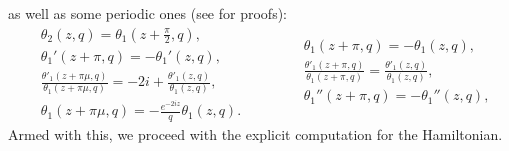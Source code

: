 \documentclass[11pt,twoside]{article}
\theoremstyle{definition}
\numberwithin{equation}{section}
\begin{document}
     as well as some periodic ones (see \cite{du1973elliptic} for proofs):
     \begin{equation}
     \label{eq: more properties of thetas}
\begin{split}
 &\theta_2(z,q) = \theta_1(z + \frac{\pi}{2},q), \\  &
         \theta_1'(z + \pi,q) = -\theta_1'(z,q),\\ 
& \frac{\theta'_1(z + \pi\mu,q)}{\theta_1(z + \pi\mu,q)} = -2i +\frac{\theta'_1(z,q)}{\theta_1(z,q)},\\ &\theta_1(z + \pi\mu,q)= -\frac{e^{-2 i z}}{q}\theta_1(z,q).
\end{split}
\ \ \ \ \ \ \ \ \ \ \ \ \
\begin{split}
&\theta_1(z+\pi,q) = -\theta_1(z,q),\\
&\frac{\theta'_1(z + \pi,q)}{\theta_1(z + \pi,q)} = \frac{\theta'_1(z,q)}{\theta_1(z,q)},\\
&\theta_1''(z + \pi,q) = -\theta_1''(z,q),\\ 
\end{split}
\end{equation}
Armed with this, we proceed with the explicit computation for the Hamiltonian. 
\end{document}
